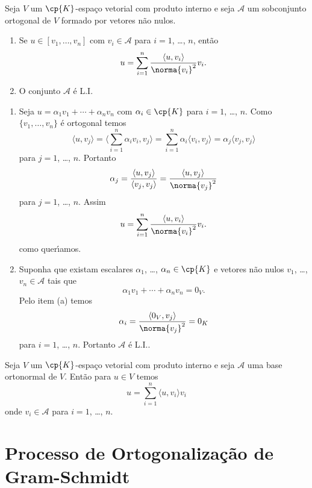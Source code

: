 \begin{proposicao}\label{ortogonalLI}
	Seja $V$ um $\cp{K}$-espa\c{c}o vetorial com produto interno e seja $\mathcal{A}$ um sobconjunto ortogonal de $V$ formado por vetores n\~ao nulos.
	\begin{enumerate}[label={\roman*})]
		\item Se $u \in [v_1, \dots, v_n]$ com $v_i \in \mathcal{A}$ para $i = 1$, \dots, $n$, ent\~ao
		\[
			u = \sum_{i = 1}^n \dfrac{\langle u, v_i \rangle}{\norma{v_i}^2}v_i.
		\]
		\item O conjunto $\mathcal{A}$ \'e L.I.
	\end{enumerate}
\end{proposicao}
\begin{prova}
	\begin{enumerate}[label={\roman*})]
		\item  Seja $u = \alpha_1 v_1 + \cdots + \alpha_n v_n$ com $\alpha_i \in \cp{K}$ para $i = 1$, \dots, $n$. Como $\{v_1, \dots, v_n\}$ \'e ortogonal temos
		\[
			\langle u, v_j \rangle = \langle \sum_{i = 1}^n\alpha_i v_i, v_j \rangle = \sum_{i = 1}^n \alpha_i\langle v_i, v_j \rangle = \alpha_j \langle v_j, v_j \rangle
		\]
		para $j = 1$, \dots, $n$. Portanto
		\[
			\alpha_j = \dfrac{\langle u, v_j \rangle}{\langle v_j, v_j \rangle} = \dfrac{\langle u, v_j \rangle}{\norma{v_j}^2}
		\]
		para $j = 1$, \dots, $n$. Assim
		\[
			u = \sum_{i = 1}^n \dfrac{\langle u, v_i \rangle}{\norma{v_i}^2}v_i.
		\]
		como quer{\'\i}amos.
		\item Suponha que existam escalares $\alpha_1$, \dots, $\alpha_n \in \cp{K}$ e vetores n\~ao nulos $v_1$, \dots, $v_n \in \mathcal{A}$ tais que
		\[
			\alpha_1 v_1 + \cdots + \alpha_n v_n = 0_V.
		\]
		Pelo item (a) temos
		\[
			\alpha_i = \dfrac{\langle 0_V, v_j \rangle}{\norma{v_j}^2} = 0_K
		\]
		para $i = 1$, \dots, $n$. Portanto $\mathcal{A}$ \'e L.I..
	\end{enumerate}
\end{prova}

\begin{corolario}
	Seja $V$ um $\cp{K}$-espa\c{c}o vetorial com produto interno e seja $\mathcal{A}$ uma base ortonormal de $V$. Ent\~ao para $u \in V$ temos
	\[
		u = \sum_{i = 1}^n \langle u, v_i\rangle v_i
	\]
	onde $v_i \in \mathcal{A}$ para $i = 1$, \dots, $n$.
\end{corolario}

\section{Processo de Ortogonaliza\c{c}\~ao de Gram-Schmidt} %
\label{sec:processo_de_ortogonaliza_cao_de_gram_schmidt}

